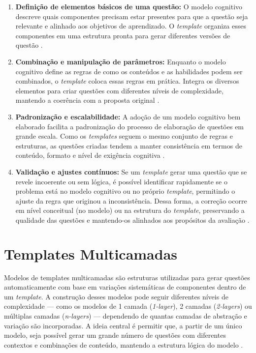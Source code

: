 \begin{enumerate} \item \textbf{Definição de elementos básicos de uma questão:} O modelo cognitivo descreve quais componentes  precisam estar presentes para que a questão seja relevante e alinhado aos objetivos de aprendizado. O \textit{template} organiza esses componentes em uma estrutura pronta para gerar diferentes versões de questão \parencite{lane2016}.

\item \textbf{Combinação e manipulação de parâmetros:}
Enquanto o modelo cognitivo define as regras de como os conteúdos e as habilidades podem ser combinados, o \textit{template} coloca essas regras em prática. Integra os diversos elementos para criar questões com diferentes níveis de complexidade, mantendo a coerência com a proposta original \parencite{embretson2017}.

\item \textbf{Padronização e escalabilidade:}
A adoção de um modelo cognitivo bem elaborado facilita a padronização do processo de elaboração de questões em grande escala. Como os \textit{templates} seguem o mesmo conjunto de regras e estruturas, as questões criadas tendem a manter consistência em termos de conteúdo, formato e nível de exigência cognitiva \parencite{gierl2017}.

\item \textbf{Validação e ajustes contínuos:}
Se um \textit{template} gerar uma questão que se revele incoerente ou sem lógica, é possível identificar rapidamente se o problema está no modelo cognitivo ou no próprio \textit{template}, permitindo o ajuste da regra que originou a inconsistência. Dessa forma, a correção ocorre em nível conceitual (no modelo) ou na estrutura do \textit{template}, preservando a qualidade das questões e mantendo-os alinhados aos propósitos da avaliação \parencite{gierlbulutzhang2018}.
\end{enumerate}


\section{Templates Multicamadas}

Modelos de templates multicamadas são estruturas utilizadas para gerar questões automaticamente com base em variações sistemáticas de componentes dentro de um \textit{template}. A construção desses modelos pode seguir diferentes níveis de complexidade — como os modelos de 1 camada (\textit{1-layer}), 2 camadas (\textit{2-layers}) ou múltiplas camadas (\textit{n-layers}) — dependendo de quantas camadas de abstração e variação são incorporadas. A ideia central é permitir que, a partir de um único modelo, seja possível gerar um grande número de questões com diferentes contextos e combinações de conteúdo, mantendo a estrutura lógica do modelo . 

